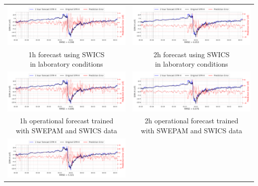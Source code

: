 \documentclass[draft,sw]{agutexSI2019}
\begin{document}
\begin{table}
\centering
\begin{tabular}{cc}
\includegraphics[width=0.49\linewidth]{paper_plots_shade/1h_swics/1h_swics_storm_39.png}
&
\includegraphics[width=0.49\linewidth]{paper_plots_shade/2h_swics/2h_swics_storm_39.png}
\\
\shortstack{1h forecast using SWICS\\ in laboratory conditions} & \shortstack{2h forecast using SWICS\\ in laboratory conditions}
\vspace*{12pt}
\\
\includegraphics[width=0.49\linewidth]{paper_plots_shade/1h_swics_rt/1h_swics_rt_storm_39.png}
&
\includegraphics[width=0.49\linewidth]{paper_plots_shade/2h_swics_rt/2h_swics_rt_storm_39.png}
\\
\shortstack{1h operational forecast trained\\ with SWEPAM and SWICS data} & \shortstack{2h operational forecast trained\\ with SWEPAM and SWICS data}
\vspace*{12pt}
\\
\includegraphics[width=0.49\linewidth]{paper_plots_shade/1h_swepam_rt/1h_swepam_rt_storm_39.png}

\end{tabular}
\end{table}
\end{document}

